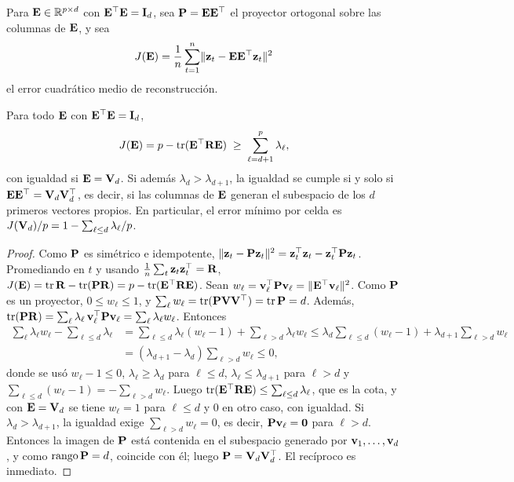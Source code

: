 Para $\mathbf{E}\in\mathbb{R}^{p\times d}$ con $\mathbf{E}^{\top}\mathbf{E}=\mathbf{I}_d$, sea $\mathbf{P}=\mathbf{E}\mathbf{E}^{\top}$ el proyector ortogonal
sobre las columnas de $\mathbf{E}$, y sea
\begin{equation}\label{eq:pca}
  J(\mathbf{E})=\frac1n\sum_{t=1}^{n}\lVert \mathbf{z}_t-\mathbf{E}\mathbf{E}^{\top}\mathbf{z}_t\rVert^2
\end{equation}
el error cuadrático medio de reconstrucción.

\begin{proposicion}\label{prop:pca}
Para todo $\mathbf{E}$ con $\mathbf{E}^{\top}\mathbf{E}=\mathbf{I}_d$,
\[
  J(\mathbf{E})=p-\operatorname{tr}(\mathbf{E}^{\top}\mathbf{R}\mathbf{E})\;\ge\;\sum_{\ell=d+1}^{p}\lambda_\ell ,
\]
con igualdad si $\mathbf{E}=\mathbf{V}_d$. Si además $\lambda_d>\lambda_{d+1}$, la igualdad se cumple si y solo
si $\mathbf{E}\mathbf{E}^{\top}=\mathbf{V}_d\mathbf{V}_d^{\top}$, es decir, si las columnas de $\mathbf{E}$ generan el subespacio de los
$d$ primeros vectores propios. En particular, el error mínimo por celda es
$J(\mathbf{V}_d)/p=1-\sum_{\ell\le d}\lambda_\ell/p$.
\end{proposicion}

\begin{proof}
Como $\mathbf{P}$ es simétrico e idempotente, $\lVert \mathbf{z}_t-\mathbf{P}\mathbf{z}_t\rVert^2=\mathbf{z}_t^{\top}\mathbf{z}_t-\mathbf{z}_t^{\top}\mathbf{P}\mathbf{z}_t$.
Promediando en $t$ y usando $\frac1n\sum_t\mathbf{z}_t\mathbf{z}_t^{\top}=\mathbf{R}$,
$J(\mathbf{E})=\operatorname{tr}\mathbf{R}-\operatorname{tr}(\mathbf{P}\mathbf{R})=p-\operatorname{tr}(\mathbf{E}^{\top}\mathbf{R}\mathbf{E})$. Sean $w_\ell=\mathbf{v}_\ell^{\top}\mathbf{P}\mathbf{v}_\ell
=\lVert \mathbf{E}^{\top}\mathbf{v}_\ell\rVert^2$. Como $\mathbf{P}$ es un proyector, $0\le w_\ell\le1$, y
$\sum_\ell w_\ell=\operatorname{tr}(\mathbf{P}\mathbf{V}\mathbf{V}^{\top})=\operatorname{tr}\mathbf{P}=d$. Además,
$\operatorname{tr}(\mathbf{P}\mathbf{R})=\sum_\ell\lambda_\ell\,\mathbf{v}_\ell^{\top}\mathbf{P}\mathbf{v}_\ell=\sum_\ell\lambda_\ell w_\ell$. Entonces
\begin{align*}
  \sum_{\ell}\lambda_\ell w_\ell-\sum_{\ell\le d}\lambda_\ell
  &=\sum_{\ell\le d}\lambda_\ell(w_\ell-1)+\sum_{\ell>d}\lambda_\ell w_\ell
  \le\lambda_d\sum_{\ell\le d}(w_\ell-1)+\lambda_{d+1}\sum_{\ell>d}w_\ell\\
  &=(\lambda_{d+1}-\lambda_d)\sum_{\ell>d}w_\ell\le0,
\end{align*}
donde se usó $w_\ell-1\le0$, $\lambda_\ell\ge\lambda_d$ para $\ell\le d$, $\lambda_\ell\le
\lambda_{d+1}$ para $\ell>d$ y $\sum_{\ell\le d}(w_\ell-1)=-\sum_{\ell>d}w_\ell$. Luego
$\operatorname{tr}(\mathbf{E}^{\top}\mathbf{R}\mathbf{E})\le\sum_{\ell\le d}\lambda_\ell$, que es la cota, y con $\mathbf{E}=\mathbf{V}_d$ se tiene
$w_\ell=1$ para $\ell\le d$ y $0$ en otro caso, con igualdad. Si $\lambda_d>\lambda_{d+1}$, la
igualdad exige $\sum_{\ell>d}w_\ell=0$, es decir, $\mathbf{P}\mathbf{v}_\ell=\mathbf{0}$ para $\ell>d$. Entonces la
imagen de $\mathbf{P}$ está contenida en el subespacio generado por $\mathbf{v}_1,\dots,\mathbf{v}_d$, y como
$\operatorname{rango}\mathbf{P}=d$, coincide con él; luego $\mathbf{P}=\mathbf{V}_d\mathbf{V}_d^{\top}$. El recíproco es inmediato.
\end{proof}


